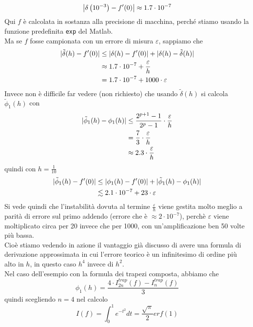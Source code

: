 \documentclass[12pt,a4paper]{article}
\DeclarePairedDelimiter{\abs}{\lvert}{\rvert}
\begin{document}
\[ \abs*{\delta \left(10^{-3}\right) - f'(0)} \approx 1.7 \cdot 10^{-7}\]
Qui $f$ è calcolata in sostanza alla precisione di macchina,
perché stiamo usando la funzione predefinita \texttt{exp} del Matlab.\\
Ma se $f$ fosse campionata con un errore di misura $\varepsilon$, sappiamo che
\[\begin{split}
    \abs{\tilde{\delta}(h) - f'(0)} & \le \abs{\delta(h) - f'(0)} + \abs{\delta(h) - \tilde{\delta}(h)} \\
    & \approx 1.7 \cdot 10^{-7} + \frac{\varepsilon}{h} \\
    & = 1.7 \cdot 10^{-7} + 1000 \cdot \varepsilon
\end{split}\]
Invece non è difficile far vedere (non richiesto) che usando $\tilde{\delta}(h)$ si calcola $\tilde{\phi}_1 (h)$ con
\[\begin{split}
    \abs{\tilde{\phi}_1 (h) - \phi_1(h)} & \le \frac{2^{p+1} - 1}{2^p-1}\cdot \frac{\varepsilon}{h} \\
    & = \frac{7}{3} \cdot \frac{\varepsilon}{h} \\
    & \approx 2.3 \cdot \frac{\varepsilon}{h}
\end{split}\]
quindi con $h=\frac{1}{10}$
\[\begin{split}
    \abs{\tilde{\phi}_1 (h) - f'(0)} & \le \abs{\phi_1(h) - f'(0)} + \abs{\tilde{\phi}_1 (h) - \phi_1(h)} \\
    & \lesssim 2.1 \cdot 10^{-7} + 23 \cdot\varepsilon 
\end{split}\]
Si vede quindi che l'instabilità dovuta al termine $\frac{\varepsilon}{h}$ viene gestita molto meglio a parità di errore sul primo addendo (errore che è $\approx 2 \cdot 10^{-7}$), perchè $\varepsilon$ viene moltiplicato circa per 20 invece che per 1000, con un'amplificazione ben 50 volte più bassa. \\
Cioè stiamo vedendo in azione
il vantaggio già discusso di avere una formula di derivazione approssimata in cui l'errore teorico è un infinitesimo di ordine più alto in $h$, in questo caso $h^4$ invece di $h^2$.\\
Nel caso dell'esempio con la formula dei trapezi composta, abbiamo che
\[\phi_1(h) = \frac{4 \cdot I_{2n}^{trap}(f) - I_n^{trap}(f)}{3}\]
quindi scegliendo $n = 4$ nel calcolo
\[I(f) = \int_0^1 e^{-t^2} dt = \frac{\sqrt{\pi}}{2} erf (1)\]
\end{document}
